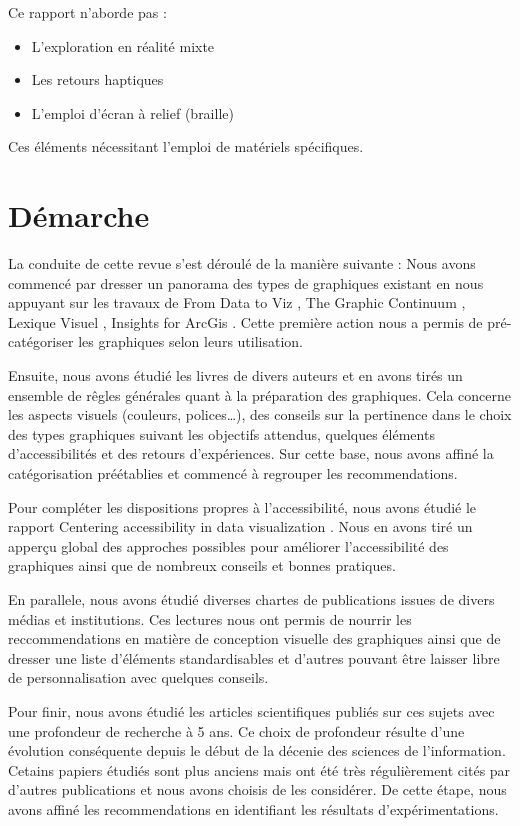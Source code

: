 \documentclass[a4paper,12pt]{article}
\begin{document}
\begin{multicols}{2}
Ce rapport n'aborde pas :
\begin{itemize}
\item L'exploration en réalité mixte
\item Les retours haptiques
\item L'emploi d'écran à relief (braille)
\end{itemize}
Ces éléments nécessitant l'emploi de matériels spécifiques.
\section*{Démarche}
\label{sec:orgbc206b6}
La conduite de cette revue s'est déroulé de la manière suivante :
Nous avons commencé par dresser un panorama des types de graphiques existant en nous appuyant sur les travaux de \og From Data to Viz\fg{} \autocite{yanholtzDataViz2018}, \og The Graphic Continuum\fg{} \autocite{jonathanschwabishGraphicContinuum2014}, \og Lexique Visuel\fg{} \autocite{alansmithLexiqueVisuel}, \og Insights for ArcGis\fg{} \autocite{lindabealeInsightsArcGIS2017}.
Cette première action nous a permis de pré-catégoriser les graphiques selon leurs utilisation.

Ensuite, nous avons étudié les livres de divers auteurs et en avons tirés un ensemble de rêgles générales quant à la préparation des graphiques. Cela concerne les aspects visuels (couleurs, polices\ldots{}), des conseils sur la pertinence dans le choix des types graphiques suivant les objectifs attendus, quelques éléments d'accessibilités et des retours d'expériences. Sur cette base, nous avons affiné la catégorisation préétablies et commencé à regrouper les recommendations.

Pour compléter les dispositions propres à l'accessibilité, nous avons étudié le rapport \og Centering accessibility in data visualization\fg{} \autocite{schwabishCenteringAccessibilityData2022}. Nous en avons tiré un apperçu global des approches possibles pour améliorer l'accessibilité des graphiques ainsi que de nombreux conseils et bonnes pratiques.

En parallele, nous avons étudié diverses chartes de publications issues de divers médias et institutions. Ces lectures nous ont permis de nourrir les reccommendations en matière de conception visuelle des graphiques ainsi que de dresser une liste d'éléments standardisables et d'autres pouvant être laisser libre de personnalisation avec quelques conseils.

Pour finir, nous avons étudié les articles scientifiques publiés sur ces sujets avec une profondeur de recherche à 5 ans. Ce choix de profondeur résulte d'une évolution conséquente depuis le début de la décenie des sciences de l'information. Cetains papiers étudiés sont plus anciens mais ont été très régulièrement cités par d'autres publications et nous avons choisis de les considérer. De cette étape, nous avons affiné les recommendations en identifiant les résultats d'expérimentations.

\end{multicols}
\end{document}
